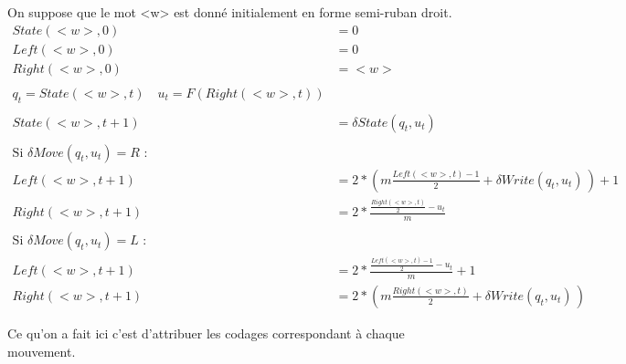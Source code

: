 \documentclass[12pt,letterpaper,boxed]{hmcpset}
\begin{document}
\begin{solution}[d)]
On suppose que le mot <w> est donné initialement en forme semi-ruban droit. \\

\begin{align*}
State(<w>,0) & = 0 \\
Left(<w>,0) & = 0 \\
Right(<w>,0) & = <w> \\ \\
q_{t} = State(<w>,t) \quad u_{t} = F(Right(<w>,t)) \\ \\
State(<w>,t+1) &= \delta State(q_{t}, u_{t}) \\ \\
\text{Si } \delta Move(q_{t}, u_{t}) = R \, \, :  \\ 
Left(<w>,t+1) &= 2*(m\frac{Left(<w>,t)-1}{2}+\delta Write(q_{t},u_{t})\, ) + 1 \\
Right(<w>,t+1) &= 2*\frac{\frac{Right(<w>,t)}{2}-u_{t}}{m} \\ \\
\text{Si } \delta Move(q_{t}, u_{t}) = L \, \, :  \\ 
Left(<w>,t+1) &=  2*\frac{\frac{Left(<w>,t)-1}{2}-u_{t}}{m} +1 \\
Right(<w>,t+1) &= 2*(m\frac{Right(<w>,t)}{2}+\delta Write(q_{t},u_{t})\, )
\end{align*}

Ce qu'on a fait ici c'est d'attribuer les codages correspondant à chaque mouvement.

\end{solution}
\end{document}
